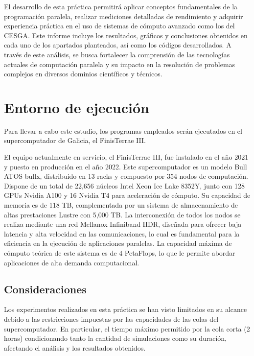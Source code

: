 \documentclass{article}
\begin{document}
	El desarrollo de esta práctica permitirá aplicar conceptos fundamentales de la programación paralela, realizar mediciones detalladas de rendimiento y adquirir experiencia práctica en el uso de sistemas de cómputo avanzado como los del CESGA. Este informe incluye los resultados, gráficos y conclusiones obtenidos en cada uno de los apartados planteados, así como los códigos desarrollados. A través de este análisis, se busca fortalecer la comprensión de las tecnologías actuales de computación paralela y su impacto en la resolución de problemas complejos en diversos dominios científicos y técnicos.

\section{Entorno de ejecución}

	Para llevar a cabo este estudio, los programas empleados serán ejecutados en el supercomputador de Galicia, el FinisTerrae III.

	El equipo actualmente en servicio, el FinisTerrae III, fue instalado en el año 2021 y puesto en producción en el año 2022. Este supercomputador es un modelo Bull ATOS bullx, distribuido en 13 racks y compuesto por 354 nodos de computación. Dispone de un total de 22,656 núcleos Intel Xeon Ice Lake 8352Y, junto con 128 GPUs Nvidia A100 y 16 Nvidia T4 para aceleración de cómputo. Su capacidad de memoria es de 118 TB, complementada por un sistema de almacenamiento de altas prestaciones Lustre con 5,000 TB. La interconexión de todos los nodos se realiza mediante una red Mellanox Infiniband HDR, diseñada para ofrecer baja latencia y alta velocidad en las comunicaciones, lo cual es fundamental para la eficiencia en la ejecución de aplicaciones paralelas. La capacidad máxima de cómputo teórica de este sistema es de 4 PetaFlops, lo que le permite abordar aplicaciones de alta demanda computacional.

\subsection{Consideraciones}

	Los experimentos realizados en esta práctica se han visto limitados en su alcance debido a las restricciones impuestas por las capacidades de las colas del supercomputador. En particular, el tiempo máximo permitido por la cola corta (2 horas) condicionando tanto la cantidad de simulaciones como su duración, afectando el análisis y los resultados obtenidos.
\end{document}
